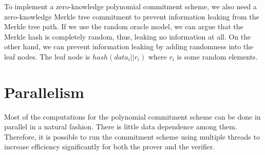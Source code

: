 To implement a zero-knowledge polynomial commitment scheme, we also need a zero-knowledge Merkle tree commitment to prevent information leaking from the Merkle tree path. If we use the random oracle model, we can argue that the Merkle hash is completely random, thus, leaking no information at all. On the other hand, we can prevent information leaking by adding randomness into the leaf nodes. The leaf node is $hash(data_i || r_i)$ where $r_i$ is some random elements. 

\section{Parallelism}

Most of the computations for the polynomial commitment scheme can be done in parallel in a natural fashion. There is little data dependence among them. Therefore, it is possible to run the commitment scheme using multiple threads to increase efficiency significantly for both the prover and the verifier.